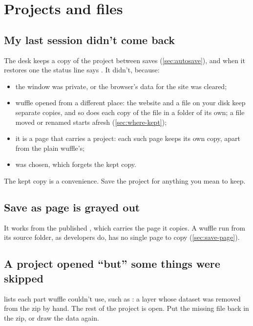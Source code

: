 \section{Projects and files}\label{sec:trouble-projects}

\subsection{My last session didn't come back}

The desk keeps a copy of the project between saves (\cref{sec:autosave}), and when it restores one the
status line says . It didn't, because:

\begin{itemize}
\item the window was private, or the browser's data for the site was cleared;
\item wuffle opened from a different place: the website and a file on your disk keep separate copies,
and so does each copy of the file in a folder of its own; a file moved or renamed starts afresh
(\cref{sec:where-kept});
\item it is a page that carries a project: each such page keeps its own copy, apart from the plain
wuffle's;
\item {} was chosen, which forgets the kept copy.
\end{itemize}

The kept copy is a convenience. Save the project for anything you mean to keep.

\subsection{Save as page is grayed out}

It works from the published , which carries the page it copies. A wuffle run from its
source folder, as developers do, has no single page to copy (\cref{sec:save-page}).

\subsection{A project opened \enquote{but} some things were skipped}

 lists each part wuffle couldn't use, such as : a layer whose dataset was removed from the zip by hand. The rest
of the project is open. Put the missing file back in the zip, or draw the data again.

